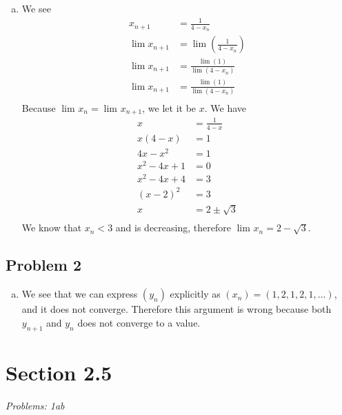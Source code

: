 \documentclass[12pt]{article}
\begin{document}
\begin{enumerate}[a).]
{    }
    \item {
        We see 
        \begin{align*}
            x_{n+1} &= \frac{1}{4 - x_n}\\
            \lim_{}x_{n+1} &= \lim_{} \left( \frac{1}{4 - x_n} \right)\\
            \lim_{}x_{n+1} &=  \frac{\lim_{}(1)}{\lim_{}(4 - x_n)} \\
            \lim_{}x_{n+1} &=  \frac{\lim_{}(1)}{\lim_{}(4 - x_n)} \\
        \end{align*}
            Because $\lim_{}x_n = \lim_{}x_{n+1}$, we let it be $x$. 
            We have 
        \begin{align*}
            x &= \frac{1}{4-x}\\
            x(4-x) &= 1\\
            4x-x^2 &= 1\\
            x^2 -4x +1 &= 0\\
            x^2 -4x +4 &= 3\\
            (x-2)^2 &= 3\\
            x &= 2 \pm \sqrt{3}\\
        \end{align*}
        We know that $x_n < 3$ and is decreasing, therefore $\lim_{}x_n = 2 - \sqrt{3}$. 
    }
\end{enumerate}


\subsection*{Problem 2}
\begin{enumerate}[a).]
    \item {
        We see that we can express $(y_n)$ explicitly as $(x_n) = (1,2,1,2,1,\dots)$, and it does not converge.
        Therefore this argument is wrong because both $y_{n+1}$ and $y_n$ does not converge to a value.

    }
\end{enumerate}

\vspace*{1cm}

\section*{Section 2.5}
\textit{Problems: 1ab}
\end{document}
